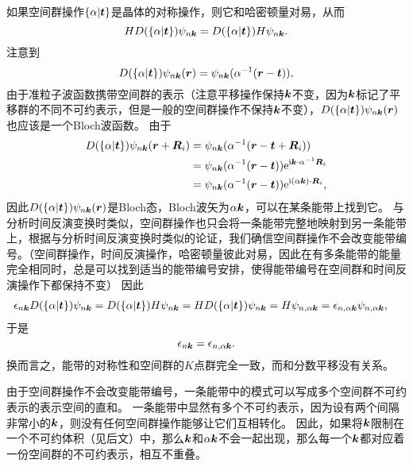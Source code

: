 如果空间群操作$\{ \alpha | \vb*{t} \}$是晶体的对称操作，则它和哈密顿量对易，从而
\[
    H D(\{ \alpha | \vb*{t} \}) \psi_{n \vb*{k}} = D(\{ \alpha | \vb*{t} \}) H \psi_{n \vb*{k}}.
\]
注意到
\[
    D(\{ \alpha | \vb*{t} \}) \psi_{n \vb*{k}} (\vb*{r}) = \psi_{n \vb*{k}} (\alpha^{-1} (\vb*{r} - \vb*{t})),
\]
由于准粒子波函数携带空间群的表示（注意平移操作保持$\vb*{k}$不变，因为$\vb*{k}$标记了平移群的不同不可约表示，但是一般的空间群操作不保持$\vb*{k}$不变），$D(\{ \alpha | \vb*{t} \}) \psi_{n \vb*{k}} (\vb*{r})$也应该是一个Bloch波函数。
由于
\[
    \begin{aligned}
        D(\{ \alpha | \vb*{t} \}) \psi_{n \vb*{k}} (\vb*{r} + \vb*{R}_i) &= \psi_{n \vb*{k}} (\alpha^{-1} (\vb*{r} - \vb*{t} + \vb*{R}_i)) \\
        &= \psi_{n \vb*{k}} (\alpha^{-1} (\vb*{r} - \vb*{t})) \mathrm{e}^{\mathrm{i} \vb*{k} \cdot \alpha^{-1} \vb*{R}_i} \\
        &= \psi_{n \vb*{k}} (\alpha^{-1} (\vb*{r} - \vb*{t})) \mathrm{e}^{\mathrm{i} (\alpha \vb*{k}) \cdot \vb*{R}_i} ,
    \end{aligned}
\]
因此$D(\{ \alpha | \vb*{t} \}) \psi_{n \vb*{k}} (\vb*{r})$是Bloch态，Bloch波矢为$\alpha \vb*{k}$，可以在某条能带上找到它。
与分析时间反演变换时类似，空间群操作也只会将一条能带完整地映射到另一条能带上，根据与分析时间反演变换时类似的论证，我们确信空间群操作不会改变能带编号。（空间群操作，时间反演操作，哈密顿量彼此对易，因此在有多条能带的能量完全相同时，总是可以找到适当的能带编号安排，使得能带编号在空间群和时间反演操作下都保持不变）
因此
\[
    \begin{aligned}
        \epsilon_{n \vb*{k}} D(\{\alpha | \vb*{t}\}) \psi_{n \vb*{k}} &= D(\{ \alpha | \vb*{t} \}) H \psi_{n \vb*{k}} = H D(\{ \alpha | \vb*{t} \}) \psi_{n \vb*{k}} = H \psi_{n, \alpha \vb*{k}} = \epsilon_{n, \alpha \vb*{k}} \psi_{n, \alpha \vb*{k}},
    \end{aligned}
\]
于是
\begin{equation}
    \epsilon_{n \vb*{k}} = \epsilon_{n, \alpha \vb*{k}}.
\end{equation}
换而言之，能带的对称性和空间群的$K$点群完全一致，而和分数平移没有关系。

由于空间群操作不会改变能带编号，一条能带中的模式可以写成多个空间群不可约表示的表示空间的直和。
一条能带中显然有多个不可约表示，因为设有两个间隔非常小的$\vb*{k}$，则没有任何空间群操作能够让它们互相转化。
因此，如果将$\vb*{k}$限制在一个不可约体积（见后文）中，那么$\vb*{k}$和$\alpha \vb*{k}$不会一起出现，那么每一个$\vb*{k}$都对应着一份空间群的不可约表示，相互不重叠。

